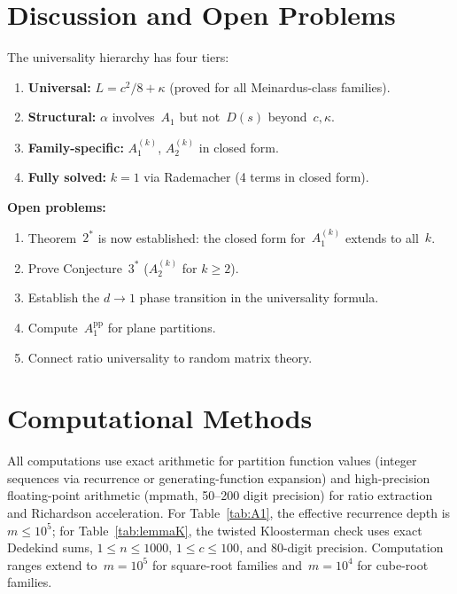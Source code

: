 \documentclass[11pt,a4paper]{article}
\begin{document}
\section{Discussion and Open Problems}\label{sec:discussion}

The universality hierarchy has four tiers:
\begin{enumerate}
  \item \textbf{Universal:} $L = c^2/8 + \kappa$ (proved for all Meinardus-class families).
  \item \textbf{Structural:} $\alpha$ involves~$A_1$ but not~$D(s)$ beyond~$c, \kappa$.
  \item \textbf{Family-specific:} $A_1^{(k)}$, $A_2^{(k)}$ in closed form.
  \item \textbf{Fully solved:} $k=1$ via Rademacher (4 terms in closed form).
\end{enumerate}

\noindent\textbf{Open problems:}
\begin{enumerate}
  \item Theorem~$2^*$ is now established: the closed form for~$A_1^{(k)}$ extends to all~$k$.
  \item Prove Conjecture~$3^*$ ($A_2^{(k)}$ for $k \geq 2$).
  \item Establish the $d \to 1$ phase transition in the universality formula.
  \item Compute~$A_1^{\mathrm{pp}}$ for plane partitions.
  \item Connect ratio universality to random matrix theory.
\end{enumerate}

\section{Computational Methods}\label{sec:computation}

All computations use exact arithmetic for partition function values (integer sequences via recurrence or generating-function expansion) and high-precision floating-point arithmetic (mpmath, 50--200 digit precision) for ratio extraction and Richardson acceleration. For Table~\ref{tab:A1}, the effective recurrence depth is $m\le 10^5$; for Table~\ref{tab:lemmaK}, the twisted Kloosterman check uses exact Dedekind sums, $1\le n\le1000$, $1\le c\le100$, and 80-digit precision. Computation ranges extend to~$m = 10^5$ for square-root families and~$m = 10^4$ for cube-root families.
\end{document}

